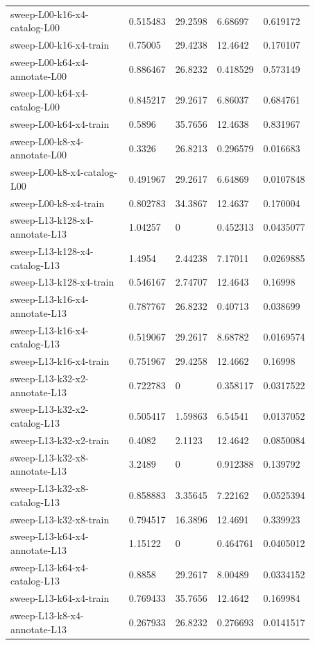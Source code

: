 \begin{longtable}{@{}L{0.39\linewidth}L{0.11\linewidth}L{0.12\linewidth}L{0.12\linewidth}L{0.13\linewidth}@{}}
sweep-L00-k16-x4-catalog-L00 & 0.515483 & 29.2598 & 6.68697 & 0.619172 \\
sweep-L00-k16-x4-train & 0.75005 & 29.4238 & 12.4642 & 0.170107 \\
sweep-L00-k64-x4-annotate-L00 & 0.886467 & 26.8232 & 0.418529 & 0.573149 \\
sweep-L00-k64-x4-catalog-L00 & 0.845217 & 29.2617 & 6.86037 & 0.684761 \\
sweep-L00-k64-x4-train & 0.5896 & 35.7656 & 12.4638 & 0.831967 \\
sweep-L00-k8-x4-annotate-L00 & 0.3326 & 26.8213 & 0.296579 & 0.016683 \\
sweep-L00-k8-x4-catalog-L00 & 0.491967 & 29.2617 & 6.64869 & 0.0107848 \\
sweep-L00-k8-x4-train & 0.802783 & 34.3867 & 12.4637 & 0.170004 \\
sweep-L13-k128-x4-annotate-L13 & 1.04257 & 0 & 0.452313 & 0.0435077 \\
sweep-L13-k128-x4-catalog-L13 & 1.4954 & 2.44238 & 7.17011 & 0.0269885 \\
sweep-L13-k128-x4-train & 0.546167 & 2.74707 & 12.4643 & 0.16998 \\
sweep-L13-k16-x4-annotate-L13 & 0.787767 & 26.8232 & 0.40713 & 0.038699 \\
sweep-L13-k16-x4-catalog-L13 & 0.519067 & 29.2617 & 8.68782 & 0.0169574 \\
sweep-L13-k16-x4-train & 0.751967 & 29.4258 & 12.4662 & 0.16998 \\
sweep-L13-k32-x2-annotate-L13 & 0.722783 & 0 & 0.358117 & 0.0317522 \\
sweep-L13-k32-x2-catalog-L13 & 0.505417 & 1.59863 & 6.54541 & 0.0137052 \\
sweep-L13-k32-x2-train & 0.4082 & 2.1123 & 12.4642 & 0.0850084 \\
sweep-L13-k32-x8-annotate-L13 & 3.2489 & 0 & 0.912388 & 0.139792 \\
sweep-L13-k32-x8-catalog-L13 & 0.858883 & 3.35645 & 7.22162 & 0.0525394 \\
sweep-L13-k32-x8-train & 0.794517 & 16.3896 & 12.4691 & 0.339923 \\
sweep-L13-k64-x4-annotate-L13 & 1.15122 & 0 & 0.464761 & 0.0405012 \\
sweep-L13-k64-x4-catalog-L13 & 0.8858 & 29.2617 & 8.00489 & 0.0334152 \\
sweep-L13-k64-x4-train & 0.769433 & 35.7656 & 12.4642 & 0.169984 \\
sweep-L13-k8-x4-annotate-L13 & 0.267933 & 26.8232 & 0.276693 & 0.0141517 \\

\end{longtable}
